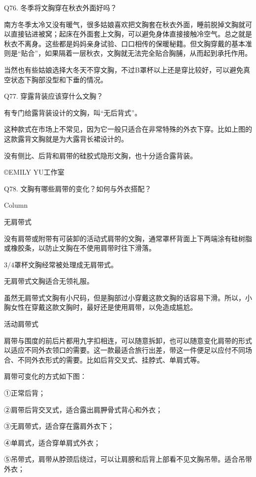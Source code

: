 \documentclass[12pt,UTF8]{ctexbook}
\begin{document}
Q76. 冬季将文胸穿在秋衣外面好吗？


南方冬季太冷又没有暖气，很多姑娘喜欢把文胸套在秋衣外面，睡前脱掉文胸就可以直接钻进被窝；起床在外面套上文胸，可以避免身体直接接触冷空气。总之就是秋衣不离身。这些都是妈妈亲身试验、口口相传的保暖秘籍。但文胸穿戴的基本准则是“贴合”，如果隔着一层秋衣，文胸就无法完全贴合胸脯，从而起到承托作用。

当然也有些姑娘选择大冬天不穿文胸，不过B罩杯以上还是穿比较好，可以避免真空状态下胸部没型和下垂的情况。





Q77. 穿露背装应该穿什么文胸？


有专门给露背装设计的文胸，叫“无后背式”。



这种款式在市场上不常见，因为它一般只适合在非常特殊的外衣下穿。比如上图的这款露背文胸就是为大露背长裙设计的。

没有侧比、后背和肩带的硅胶式隐形文胸，也十分适合露背装。

©EMILY YU工作室





Q78. 文胸有哪些肩带的变化？如何与外衣搭配？



Column

无肩带式

没有肩带或附带有可装卸的活动式肩带的文胸，通常罩杯背面上下两端涂有硅树脂或橡胶条，以防止文胸在不使用肩带时往下滑落。

3/4罩杯文胸经常被处理成无肩带式。

无肩带式文胸适合无领礼服。

虽然无肩带式文胸有小尺码，但是胸部过小穿戴这款文胸的话容易下滑。所以，小胸女性在穿戴这款文胸时，最好还是使用肩带，以免造成尴尬。

活动肩带式

肩带与围度的前后片都用九字扣相连，可以随意拆卸，也可以随意变化肩带的形式以适应不同外衣领口的需要。这一款最适合旅行出差，带这一件便足以应付不同场合、不同外衣形式的需要。比如后背交叉式、挂脖式、单肩式等。

肩带可变化的方式如下图：

①正常后背；

②肩带后背交叉式，适合露出肩胛骨式背心和外衣；

③无肩带式，适合穿在露肩外衣下；

④单肩式，适合穿单肩式外衣；

⑤吊带式，肩带从脖颈后绕过，可以让肩膀和后背上部看不见文胸吊带。适合吊带外衣；
\end{document}
